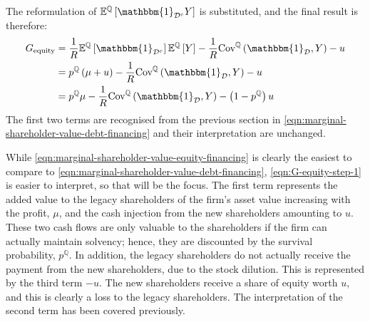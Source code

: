 \documentclass[main.tex]{subfiles}
\begin{document}
        The reformulation of $\mathbb{E}^{\mathbb{Q}}\left[\mathbbm{1}_{\mathcal{D}^{c}} Y\right]$ is substituted, 
        and the final result is therefore:
            \begin{align}
                G_{\text{equity}} &=
                    \discountfactor
                    \mathbb{E}^{\mathbb{Q}}\left[\mathbbm{1}_{\mathcal{D}^{c}}\right]
                    \mathbb{E}^{\mathbb{Q}}\left[Y\right]
                    -
                    \discountfactor
                    \text{Cov}^{\mathbb{Q}}\left(
                        \mathbbm{1}_{\mathcal{D}},
                        Y
                    \right)
                    -
                    u
                    \nonumber \\
                &= 
                    p^{\mathbb{Q}}
                    \left(
                        \mu
                        +
                        u
                    \right)
                    -
                    \discountfactor
                    \text{Cov}^{\mathbb{Q}}\left(
                        \mathbbm{1}_{\mathcal{D}},
                        Y
                    \right)
                    -
                    u 
                    \label{eqn:G-equity-step-1} \\
                &= 
                    p^{\mathbb{Q}}
                    \mu
                    -
                    \discountfactor
                    \text{Cov}^{\mathbb{Q}}\left(
                        \mathbbm{1}_{\mathcal{D}},
                        Y
                    \right)
                    -
                    \left(
                        1
                        -
                        p^{\mathbb{Q}}
                    \right)
                    u 
                \label{eqn:marginal-shareholder-value-equity-financing}
            \end{align}
        The first two terms are recognised from the previous section in 
        \cref{eqn:marginal-shareholder-value-debt-financing}
        and their interpretation are unchanged. 

        While \cref{eqn:marginal-shareholder-value-equity-financing} is clearly the easiest to compare to 
        \cref{eqn:marginal-shareholder-value-debt-financing},
        \cref{eqn:G-equity-step-1} is easier to interpret, so that will be the focus.
        The first term represents the added value to the legacy shareholders of 
        the firm's asset value increasing with the profit, $\mu$,
        and the cash injection from the new shareholders amounting to $u$.
        These two cash flows are only valuable to the shareholders if the firm can actually maintain solvency;
        hence, they are discounted by the survival probability, $p^{\mathbb{Q}}$.
        In addition, the legacy shareholders do not actually receive 
        the payment from the new shareholders, due to the stock dilution.
        This is represented by the third term $-u$.
        The new shareholders receive a share of equity worth $u$, 
        and this is clearly a loss to the legacy shareholders.
        The interpretation of the second term has been covered previously.
\end{document}
